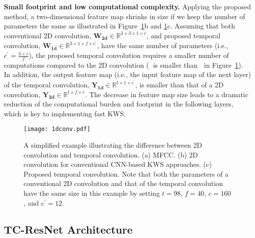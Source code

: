 \documentclass[a4paper]{article}
\begin{document}
\textbf{Small footprint and low computational complexity.} 
Applying the proposed method, a two-dimensional feature map shrinks in size if we keep the number of parameters the same as illustrated in Figure~\ref{fig:1dconv}b and \ref{fig:1dconv}c.
Assuming that both conventional 2D convolution, $\mathbf{W_{2d}} \in \mathbb{R} ^ {3 \times 3 \times 1 \times c}$, and proposed temporal convolution, $\mathbf{W_{1d}} \in \mathbb{R}^{3 \times 1 \times f \times c^{\prime}}$, have the same number of parameters (i.e., $c^{\prime}=\frac{3 \times c}{f}$), the proposed temporal convolution requires a smaller number of computations compared to the 2D convolution (\textcircled{\raisebox{-0.9pt}{2}} is smaller than \textcircled{\raisebox{-0.9pt}{1}} in Figure~\ref{fig:1dconv}).
In addition, the output feature map (i.e., the input feature map of the next layer) of the temporal convolution, $\mathbf{Y_{1d}} \in \mathbb{R}^{t \times 1\times c^{\prime}}$, is smaller than that of a 2D convolution, $\mathbf{Y_{2d}} \in \mathbb{R}^{t \times f\times c}$.
The decrease in feature map size leads to a dramatic reduction of the computational burden and footprint in the following layers, which is key to implementing fast KWS.

\begin{figure}[h]
    \texttt{[image: 1dconv.pdf]}
    \caption{A simplified example illustrating the difference between 2D convolution and temporal convolution. (a) MFCC. (b) 2D convolution for conventional CNN-based KWS approaches. (c) Proposed temporal convolution. Note that both the parameters of a conventional 2D convolution and that of the temporal convolution have the same size in this example by setting $t=98$, $f=40$, $c=160$, and $c^{\prime}=12$.}
    \vspace{-0.2cm}
    \label{fig:1dconv}
\end{figure}


\subsection{TC-ResNet Architecture} \label{subsection:architecture}
\end{document}
